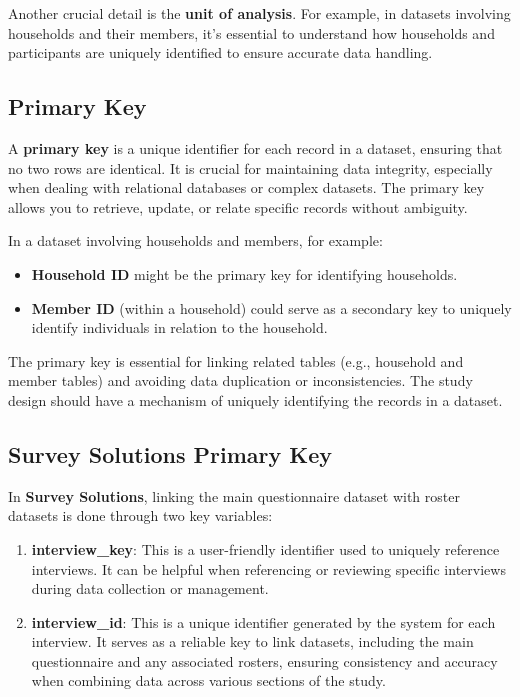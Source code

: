 \documentclass[
  letterpaper,
  DIV=11,
  numbers=noendperiod]{scrreprt}
\begin{document}
Another crucial detail is the \textbf{unit of analysis}. For example, in
datasets involving households and their members, it's essential to
understand how households and participants are uniquely identified to
ensure accurate data handling.

\subsection{Primary Key}\label{primary-key}

A \textbf{primary key} is a unique identifier for each record in a
dataset, ensuring that no two rows are identical. It is crucial for
maintaining data integrity, especially when dealing with relational
databases or complex datasets. The primary key allows you to retrieve,
update, or relate specific records without ambiguity.

In a dataset involving households and members, for example:

\begin{itemize}
\item
  \textbf{Household ID} might be the primary key for identifying
  households.
\item
  \textbf{Member ID} (within a household) could serve as a secondary key
  to uniquely identify individuals in relation to the household.
\end{itemize}

The primary key is essential for linking related tables (e.g., household
and member tables) and avoiding data duplication or inconsistencies. The
study design should have a mechanism of uniquely identifying the records
in a dataset.

\subsection{Survey Solutions Primary
Key}\label{survey-solutions-primary-key}

In \textbf{Survey Solutions}, linking the main questionnaire dataset
with roster datasets is done through two key variables:

\begin{enumerate}
\def\labelenumi{\arabic{enumi}.}
\item
  \textbf{interview\_key}: This is a user-friendly identifier used to
  uniquely reference interviews. It can be helpful when referencing or
  reviewing specific interviews during data collection or management.
\item
  \textbf{interview\_id}: This is a unique identifier generated by the
  system for each interview. It serves as a reliable key to link
  datasets, including the main questionnaire and any associated rosters,
  ensuring consistency and accuracy when combining data across various
  sections of the study.
\end{enumerate}
\end{document}
